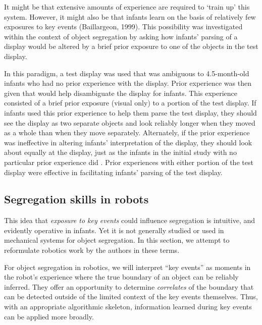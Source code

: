 It might be that extensive amounts of experience are required to
`train up' this system.  However, it might also be that infants learn
on the basis of relatively few exposures to key events (Baillargeon,
1999).  This possibility was investigated within the context of object
segregation by asking how infants' parsing of a display would be
altered by a brief prior exposure to one of the objects in the test
display.


In this paradigm, a test display was used that was ambiguous to
4.5-month-old infants who had no prior experience with the display.
Prior experience was then given that would help disambiguate the display
for infants.  This experience consisted of a brief prior exposure
(visual only) to a portion of the test display.  If infants used this
prior experience to help them parse the test display, they should see
the display as two separate objects and look reliably longer when they
moved as a whole than when they move separately.  Alternately, if the
prior experience was ineffective in altering infants'
interpretation of the display, they should look about equally at the
display, just as the infants in the initial study with no particular
prior experience did \cite{needham98effects}.  Prior experiences
with either portion of the test display were effective in facilitating
infants' parsing of the test display.  

%



\subsection{Segregation skills in robots}



This idea that {\em exposure to key events} could influence
segregation is intuitive, and evidently operative in infants.  Yet it
is not generally studied or used in mechanical systems for object
segregation.  In this section, we attempt to reformulate robotics
work by the authors in these terms.

For object segregation in robotics, we will interpret ``key events''
as moments in the robot's experience where the true boundary of an
object can be reliably inferred.  They offer an opportunity to
determine {\em correlates} of the boundary that can be detected
outside of the limited context of the key events themselves.  Thus,
with an appropriate algorithmic skeleton, information learned during
key events can be applied more broadly.

